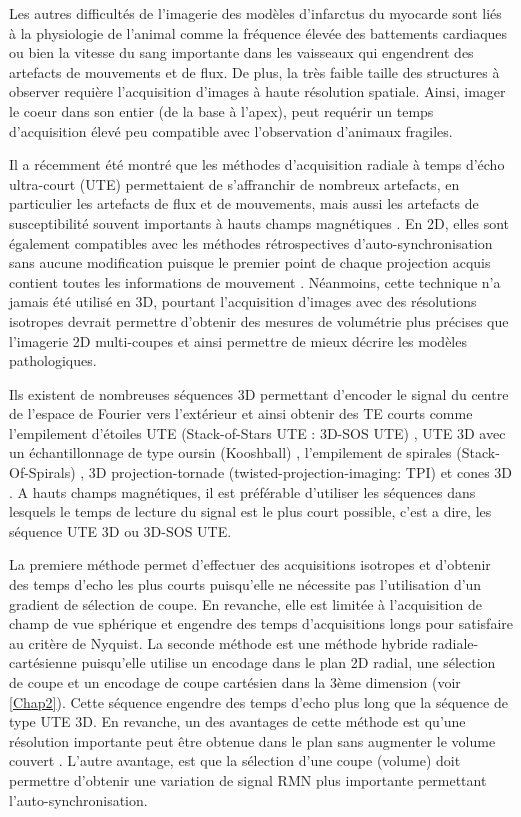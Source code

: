 Les autres difficultés de l’imagerie des modèles d’infarctus du myocarde sont liés à la physiologie de l’animal comme la fréquence élevée des battements cardiaques ou bien la vitesse du sang importante dans les vaisseaux qui engendrent des artefacts de mouvements et de flux. De plus, la très faible taille des structures à observer requière l’acquisition d’images à haute résolution spatiale. Ainsi, imager le coeur dans son entier (de la base à l’apex), peut requérir un temps d’acquisition élevé peu compatible avec l’observation d’animaux fragiles.

Il a récemment été montré que les méthodes d’acquisition radiale à temps d’écho ultra-court (UTE) permettaient de s’affranchir de nombreux artefacts, en particulier les artefacts de flux et de mouvements, mais aussi les artefacts de susceptibilité souvent importants à hauts champs magnétiques \cite{Hoerr:2013gf,Motaal:2015aa,trotier2015positive}. En 2D, elles sont également compatibles avec les méthodes rétrospectives d’auto-synchronisation sans aucune modification puisque le premier point de chaque projection acquis contient toutes les informations de mouvement \cite{ Hoerr:2013gf}.
Néanmoins, cette technique n’a jamais été utilisé en 3D, pourtant l'acquisition d'images avec des résolutions isotropes devrait permettre d’obtenir des mesures de volumétrie plus précises que l’imagerie 2D multi-coupes \cite{sorensen2005three} et ainsi permettre de mieux décrire les modèles pathologiques.

Ils existent de nombreuses séquences 3D permettant d’encoder le signal du centre de l’espace de Fourier vers l’extérieur et ainsi obtenir des TE courts comme l'empilement d'étoiles UTE (Stack-of-Stars UTE : 3D-SOS UTE) \cite{glover1992projection}, UTE 3D avec un échantillonnage de type oursin (Kooshball) \cite{glover1992boron}, l'empilement de spirales (Stack-Of-Spirals) \cite{irarrazabal1995fast}, 3D projection-tornade (twisted-projection-imaging: TPI) \cite{boada1997fast} et cones 3D \cite{Gurney:2006fk}. A hauts champs magnétiques, il est préférable d’utiliser les séquences dans lesquels le temps de lecture du signal est le plus court possible, c’est a dire, les séquence UTE 3D ou 3D-SOS UTE.

La premiere méthode permet d'effectuer des acquisitions isotropes et d’obtenir des temps d’echo les plus courts puisqu’elle ne nécessite pas l’utilisation d’un gradient de sélection de coupe. En revanche, elle est limitée à l’acquisition de champ de vue sphérique et engendre des temps d’acquisitions longs pour satisfaire au critère de Nyquist.
La seconde méthode est une méthode hybride radiale-cartésienne puisqu’elle utilise un encodage dans le plan 2D radial, une sélection de coupe et un encodage de coupe cartésien dans la 3ème dimension (voir \ref{Chap2}). Cette séquence engendre des temps d’echo plus long que la séquence de type UTE 3D. En revanche, un des avantages de cette méthode est qu’une résolution importante peut être obtenue dans le plan sans augmenter le volume couvert \cite{kadbi20154d}. L’autre avantage, est que la sélection d’une coupe (volume) doit permettre d’obtenir une variation de signal RMN plus importante permettant l’auto-synchronisation.

